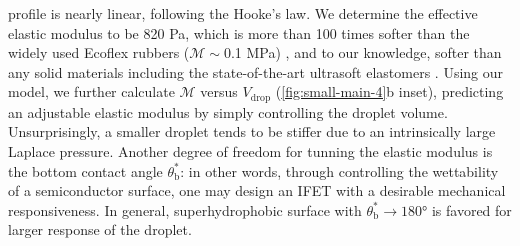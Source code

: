   \varepsilon\) profile is nearly linear, following the Hooke's law. We
determine the effective elastic modulus to be 820 Pa, which is more
than 100 times softer than the widely used Ecoflex rubbers
(\(\mathscr{M}\sim{}\)0.1 MPa) \cite{Mosadegh_2014_soft_robot}, and to our knowledge, softer than any solid
materials including the state-of-the-art ultrasoft elastomers
\cite{Miriyev_2017_soft_mater,Jang_2015_soft_network}.
%
Using our model, we further calculate \(\mathscr{M}\) versus
\(V_{\mathrm{drop}}\) (\autoref{fig:small-main-4}b inset), predicting
an adjustable elastic modulus by simply controlling the droplet
volume. Unsurprisingly, a smaller droplet tends to be stiffer due to
an intrinsically large Laplace pressure. Another degree of freedom for
tunning the elastic modulus is the bottom contact angle
$\theta_{\mathrm{b}}^{*}$: in other words, through controlling the
wettability of a semiconductor surface, one may design an IFET with a
desirable mechanical responsiveness. In general, superhydrophobic
surface with $\theta_{\mathrm{b}}^{*} \to 180°$ is favored for larger
response of the droplet.

